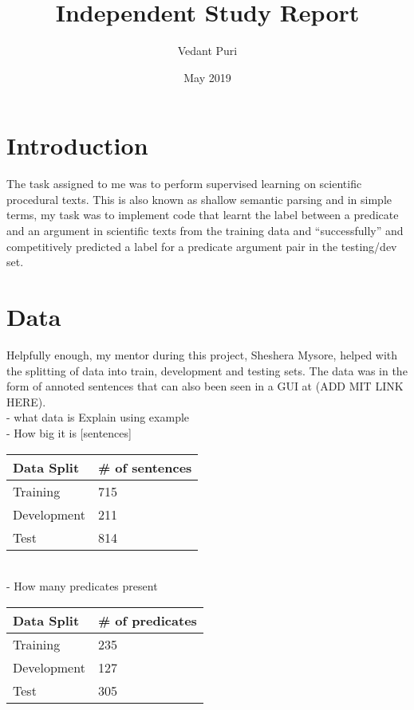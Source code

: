 \documentclass[11pt]{article}
\title{Independent Study Report}
\author{Vedant Puri}
\date{May 2019}
\begin{document}
\maketitle

\section{Introduction}
The task assigned to me was to perform supervised learning on scientific procedural texts. This is also known as shallow semantic parsing and in simple terms, my task was to implement code that learnt the label between a predicate and an argument in scientific texts from the training data and ``successfully'' and competitively predicted a label for a predicate argument pair in the testing/dev set.


\section{Data}
Helpfully enough, my mentor during this project, Sheshera Mysore, helped with the splitting of data into train, development and testing sets. The data was in the form of annoted sentences that can also been seen in a GUI at (ADD MIT LINK HERE). \\
- what data is Explain using example\\

- How big it is [sentences] \\
\begin{tabu} to 0.8\textwidth { | X[l] | X[c] | }
 \hline
 \textbf{Data Split} & \textbf{\# of sentences}\\
 \hline
 Training  & 715\\
\hline
Development  & 211\\
\hline
Test  & 814\\
\hline
\end{tabu} \\

- How many predicates present \\
\begin{tabu} to 0.8\textwidth { | X[l] | X[c] | }
 \hline
 \textbf{Data Split} & \textbf{\# of predicates}\\
 \hline
 Training  & 235\\
\hline
Development  & 127\\
\hline
Test  & 305\\
\hline
\end{tabu} \\
\end{document}
